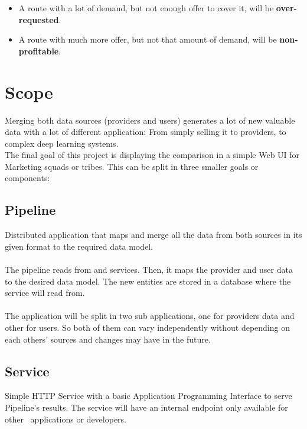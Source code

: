 \begin{itemize}
  \item A route with a lot of demand, but not enough offer to cover it, will be \textbf{over-requested}.
  \item A route with much more offer, but not that amount of demand, will be \textbf{non-profitable}.
\end{itemize}


\section{Scope}

Merging both data sources (providers and users) generates a lot of new valuable data with a lot of different application: From simply selling it to providers, to complex deep learning systems.
\\
The final goal of this project is displaying the comparison in a simple Web UI for Marketing squads or tribes. This can be split in three smaller goals or components:

\subsection{Pipeline}

Distributed application that maps and merge all the data from both sources in its given format to the required data model.
\\\\
The pipeline reads from  and  services. Then, it maps the provider and user data to the desired data model. The new entities are stored in a database where the service will read from.
\\\\
The application will be split in two sub applications, one for providers data and other for users. So both of them can vary independently without depending on each others' sources and changes may have in the future.

\subsection{Service}

Simple HTTP Service with a basic Application Programming Interface to serve Pipeline's results. The service will have an internal endpoint only available for other \company\ applications or developers.

